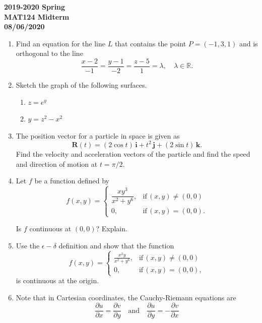 \documentclass[a4paper, 12pt]{article}
\begin{document}
\pagestyle{empty}

\begin{center}
\textbf{2019-2020 Spring \\MAT124 Midterm\\08/06/2020}
\end{center}

\begin{enumerate}[leftmargin=*,label=\textbf{\arabic*.}]
\item Find an equation for the line $L$ that contains the point $P= (-1,3,1)$ and is orthogonal to the line
\[\frac{x-2}{-1}=\frac{y-1}{-2}=\frac{z-5}{1}=\lambda,\quad\lambda\in\mathbb{R}.\]

\item Sketch the graph of the following surfaces.

\begin{enumerate}[leftmargin=*,label=\textbf{\alph*.}]
\item $z= e^y$ \item $y=z^2-x^2$
\end{enumerate}

\item The position vector for a particle in space is given as
\[\textbf{R}(t) = (2\cos t)\,\textbf{i}+t^2\,\textbf{j}+(2\sin t)\,\textbf{k}.\]
Find the velocity and acceleration vectors of the particle and find the speed and direction of motion at $t=\pi/2$.

\item Let $f$ be a function defined by
\[
f(x,y) =
\left.
\begin{cases}
\dfrac{xy^3}{x^2+y^6},&\text{if}\, (x, y)\neq (0,0)\\[1em]0,&\text{if}\,(x,y)=(0,0).
\end{cases}
\right.
\]

Is $f$ continuous at $(0,0)$? Explain.

\item Use the $\epsilon - \delta$ definition and show that the function
\[
f(x,y) =
\left.
\begin{cases}
\displaystyle \frac{x^2y}{x^2+y^6},&\text{if}\, (x, y)\neq (0,0)\\[1em]0,&\text{if}\,(x,y)=(0,0),
\end{cases}
\right.
\]
is continuous at the origin.

\item Note that in Cartesian coordinates, the Cauchy-Riemann equations are
\[\frac{\partial u}{\partial x}=\frac{\partial v}{\partial y}\quad\text{and}\quad\frac{\partial u}{\partial y}=-\frac{\partial v}{\partial x}\]


\end{enumerate}
\end{document}

